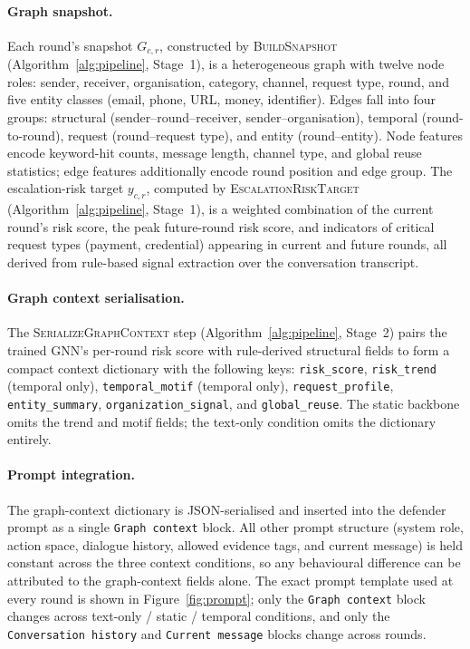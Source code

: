 \documentclass[10pt,letterpaper]{article}
\begin{document}
\paragraph{Graph snapshot.}
Each round's snapshot $G_{c,r}$, constructed by \textsc{BuildSnapshot} (Algorithm~\ref{alg:pipeline}, Stage~1), is a heterogeneous graph with twelve node roles: sender, receiver, organisation, category, channel, request type, round, and five entity classes (email, phone, URL, money, identifier). Edges fall into four groups: structural (sender--round--receiver, sender--organisation), temporal (round-to-round), request (round--request type), and entity (round--entity). Node features encode keyword-hit counts, message length, channel type, and global reuse statistics; edge features additionally encode round position and edge group. The escalation-risk target $y_{c,r}$, computed by \textsc{EscalationRiskTarget} (Algorithm~\ref{alg:pipeline}, Stage~1), is a weighted combination of the current round's risk score, the peak future-round risk score, and indicators of critical request types (payment, credential) appearing in current and future rounds, all derived from rule-based signal extraction over the conversation transcript.

\paragraph{Graph context serialisation.}
The \textsc{SerializeGraphContext} step (Algorithm~\ref{alg:pipeline}, Stage~2) pairs the trained GNN's per-round risk score with rule-derived structural fields to form a compact context dictionary with the following keys: \texttt{risk\_score}, \texttt{risk\_trend} (temporal only), \texttt{temporal\_motif} (temporal only), \texttt{request\_profile}, \texttt{entity\_summary}, \texttt{organization\_signal}, and \texttt{global\_reuse}. The static backbone omits the trend and motif fields; the text-only condition omits the dictionary entirely.

\paragraph{Prompt integration.}
The graph-context dictionary is JSON-serialised and inserted into the defender prompt as a single \texttt{Graph context} block. All other prompt structure (system role, action space, dialogue history, allowed evidence tags, and current message) is held constant across the three context conditions, so any behavioural difference can be attributed to the graph-context fields alone. The exact prompt template used at every round is shown in Figure~\ref{fig:prompt}; only the \texttt{Graph context} block changes across text-only / static / temporal conditions, and only the \texttt{Conversation history} and \texttt{Current message} blocks change across rounds.
\end{document}
